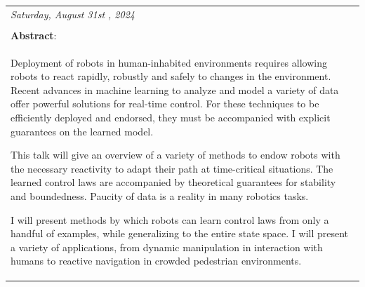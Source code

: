 \documentclass[
	openany, %
	parskip=full, %
	12pt, %
	a4paper, %
]{conferencebooklet} %
\begin{document}
\begin{table}[h!]
{\begin{tabular}{p{75mm}}
            \large \textit{Saturday, August 31st , 2024} \\ \\
            \textbf{Abstract}: \\
            Deployment of robots in human-inhabited environments requires allowing robots to react rapidly, robustly and safely to changes in the environment. Recent advances in machine learning to analyze and model a variety of data offer powerful solutions for real-time control. For these techniques to be efficiently deployed and endorsed, they must be accompanied with explicit guarantees on the learned model.
            
            This talk will give an overview of a variety of methods to endow robots with the necessary reactivity to adapt their path at time-critical situations. The learned control laws are accompanied by theoretical guarantees for stability and boundedness. Paucity of data is a reality in many robotics tasks. 
            
            I will present methods by which robots can learn control laws from only a handful of examples, while generalizing to the entire state space. I will present a variety of applications, from dynamic manipulation in interaction with humans to reactive navigation in crowded pedestrian environments.
        \end{tabular}
    }
\end{table}

\end{document}
